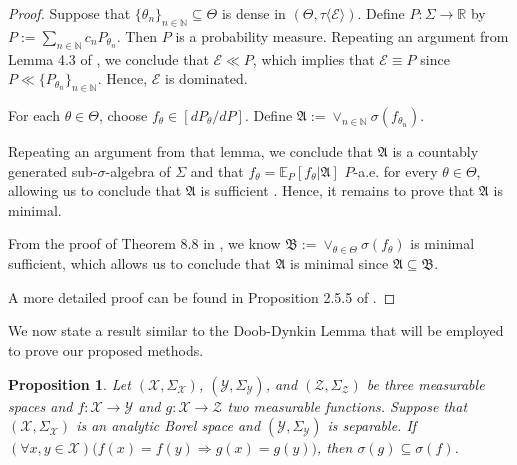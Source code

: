 \documentclass[12pt]{article}
\newtheorem{proposition}{Proposition}[section]
\begin{document}
\begin{proof}
Suppose that $\{\theta _n\}_{n\in\mathbb{N}}\subseteq\Theta$ is dense in $(\Theta,\tau \langle \mathcal{E}\rangle )$. Define $P:\Sigma \to \mathbb{R}$ by $P:=\sum _{n\in\mathbb{N}}c_nP_{\theta _n}$. Then $P$ is a probability measure. Repeating an argument from Lemma 4.3 of \cite{Strasser1985}, we conclude that $\mathcal{E}\ll P$, which implies that $\mathcal{E}\equiv P$ since $P\ll \{P_{\theta_n} \}_{n\in\mathbb{N}}$. Hence, $\mathcal{E}$ is dominated.

For each $\theta\in\Theta$, choose $f_\theta \in [dP_\theta /dP]$. Define $\mathfrak{A}:=\vee _{n\in\mathbb{N}}\sigma (f_{\theta _n})$.

Repeating an argument from that lemma, we conclude that $\mathfrak{A}$ is a countably generated sub-$\sigma$-algebra of $\Sigma$  and that $f_\theta =\mathbb{E}_P[f_\theta |\mathfrak{A}]$ $P$-a.e. for every $\theta\in\Theta $, allowing us to conclude that $\mathfrak{A}$ is sufficient \citep[Lemma 20.6]{Strasser1985}. Hence, it remains to prove that $\mathfrak{A}$ is minimal.

From the proof of Theorem 8.8 in \cite{Heyer1982}, we know $\mathfrak{B}:=\vee_{\theta\in\Theta }\sigma (f_\theta )$ is minimal sufficient, which allows us to conclude that $\mathfrak{A}$ is minimal since $\mathfrak{A}\subseteq \mathfrak{B}$.

A more detailed proof can be found in Proposition 2.5.5 of \cite{Cavalcante2026}.
\end{proof}

We now state a result similar to the Doob-Dynkin Lemma that will be employed to prove our proposed methods.

\begin{proposition}
\label{prop:4.8}
Let $(\mathcal{X},\Sigma _\mathcal{X})$, $(\mathcal{Y},\Sigma _\mathcal{Y})$, and $(\mathcal{Z},\Sigma _\mathcal{Z})$ be three measurable spaces and $f:\mathcal{X}\to \mathcal{Y}$ and $g:\mathcal{X}\to \mathcal{Z}$ two measurable functions. Suppose that $(\mathcal{X},\Sigma _\mathcal{X})$ is an analytic Borel space and $(\mathcal{Y},\Sigma _\mathcal{Y})$ is separable. If $(\forall x,y\in \mathcal{X})\big(f(x)=f(y)\Rightarrow g(x)=g(y)\big)$, then $\sigma (g)\subseteq \sigma (f)$.
\end{proposition}
\end{document}
